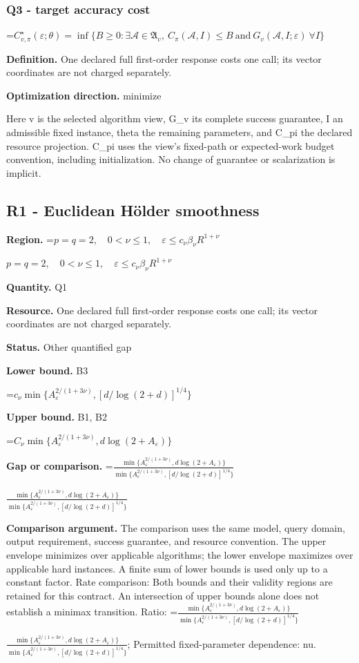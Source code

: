 \documentclass[10pt,a4paper]{article}
\newcommand{\AtlasMath}[1]{\par\begingroup\centering\setbox0=\hbox{$\displaystyle #1$}\ifdim\wd0>1.4\linewidth\typeout{ATLAS WIDE FORMULA: \the\wd0}\fi\ifdim\wd0>\linewidth\resizebox{\linewidth}{!}{\box0}\else\box0\fi\par\endgroup}
\newcommand{\AtlasInlineMath}[1]{\begingroup\setbox0=\hbox{$#1$}\ifdim\wd0>.4\linewidth\endgroup\AtlasMath{#1}\else\endgroup$#1$\fi}
\begin{document}
\subsubsection{Q3 - target accuracy cost}
\AtlasMath{C^\star_{v,\pi}(\varepsilon;\theta)=\inf\{B\ge0:\exists\mathcal A\in\mathfrak A_v,\ C_\pi(\mathcal A,I)\le B\ \text{and}\ G_v(\mathcal A,I;\varepsilon)\ \forall I\}}
\textbf{Definition.} One declared full first-order response costs one call; its vector coordinates are not charged separately.

\textbf{Optimization direction.} minimize

Here v is the selected algorithm view, G\_v its complete success guarantee, I an admissible fixed instance, theta the remaining parameters, and C\_pi the declared resource projection. C\_pi uses the view's fixed-path or expected-work budget convention, including initialization. No change of guarantee or scalarization is implicit.

\subsection{R1 - Euclidean Hölder smoothness}
\textbf{Region.} \AtlasInlineMath{p=q=2,\quad0<\nu\le1,\quad\varepsilon\le c_\nu\beta_\nu R^{1+\nu}}

\textbf{Quantity.} Q1

\textbf{Resource.} One declared full first-order response costs one call; its vector coordinates are not charged separately.

\textbf{Status.} Other quantified gap

\textbf{Lower bound.} B3

\AtlasMath{c_\nu\min\{A_\varepsilon^{2/(1+3\nu)},[d/\log(2+d)]^{1/4}\}}
\textbf{Upper bound.} B1, B2

\AtlasMath{C_\nu\min\{A_\varepsilon^{2/(1+3\nu)},d\log(2+A_\varepsilon)\}}
\textbf{Gap or comparison.} \AtlasInlineMath{\frac{\min\{A_\varepsilon^{2/(1+3\nu)},d\log(2+A_\varepsilon)\}}{\min\{A_\varepsilon^{2/(1+3\nu)},[d/\log(2+d)]^{1/4}\}}}

\textbf{Comparison argument.} The comparison uses the same model, query domain, output requirement, success guarantee, and resource convention. The upper envelope minimizes over applicable algorithms; the lower envelope maximizes over applicable hard instances. A finite sum of lower bounds is used only up to a constant factor. Rate comparison: Both bounds and their validity regions are retained for this contract. An intersection of upper bounds alone does not establish a minimax transition. Ratio: \AtlasInlineMath{\frac{\min\{A_\varepsilon^{2/(1+3\nu)},d\log(2+A_\varepsilon)\}}{\min\{A_\varepsilon^{2/(1+3\nu)},[d/\log(2+d)]^{1/4}\}}}; Permitted fixed-parameter dependence: nu.
\end{document}
